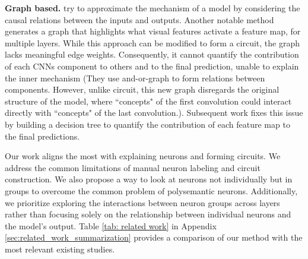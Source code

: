 \textbf{Graph based.} \citet{input_output_DNNs, input_output_generizable} try to approximate the mechanism of a model by considering the causal relations between the inputs and outputs. 
Another notable method \citep{InterpretCNN} generates a graph that highlights what visual features activate a feature map, for multiple layers. While this approach can be modified to form a circuit, the graph lacks meaningful edge weights. Consequently, it cannot quantify the contribution of each CNNs component to others and to the final prediction, unable to explain the inner mechanism (They use and-or-graph \citep{And_or_graph} to form relations between components. However, unlike circuit, this new graph disregards the original structure of the model, where ``concepts" of the first convolution could interact directly with ``concepts" of the last convolution.). Subsequent work \citep{DecisiontreeCNN} fixes this issue by building a decision tree to quantify the contribution of each feature map to the final predictions. 

Our work aligns the most with explaining neurons and forming circuits. We address the common limitations of manual neuron labeling and circuit construction. We also propose a way to look at neurons not individually but in groups 
to overcome the common problem of polysemantic neurons. Additionally, we prioritize exploring the interactions between neuron groups across layers rather than focusing solely on the relationship between individual neurons and the model's output. Table \ref{tab: related work} in Appendix \ref{sec:related_work_summarization} provides a comparison of our method with the most relevant existing studies.
